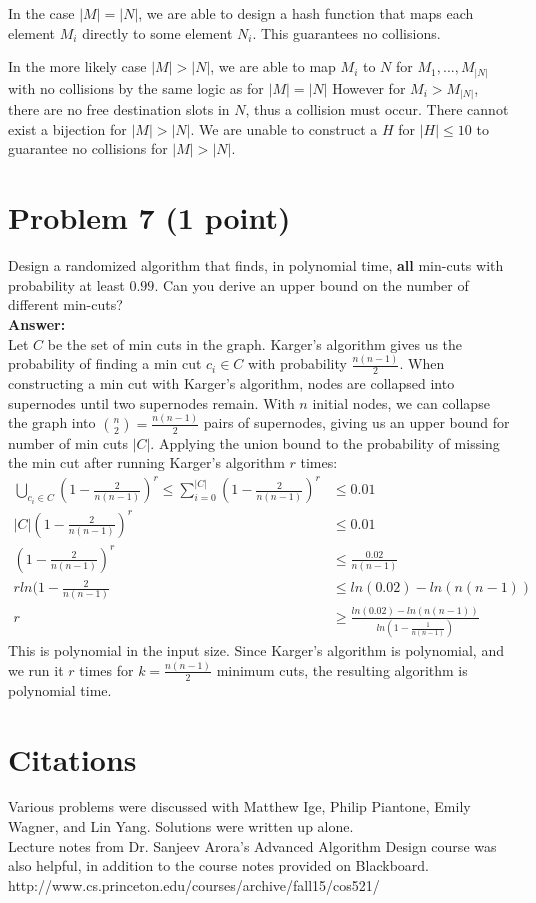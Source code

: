 \documentclass[letterpaper, 11pt]{article}
\begin{document}
In the case $|M|=|N|$, we are able to design a hash function that maps each element $M_i$ directly to some element $N_i$. This guarantees no collisions.

In the more likely case $|M| > |N|$, we are able to map $M_i$ to $N$ for $M_1, ...,M_{|N|}$ with no collisions by the same logic as for $|M| = |N|$ However for $M_i > M_{|N|}$, there are no free destination slots in $N$, thus a collision must occur. There cannot exist a bijection for $|M| > |N|$. We are unable to construct a $H$ for $|H| \leq 10$ to guarantee no collisions for $|M| > |N|$. 
\pagebreak
\section*{Problem 7 (1 point)}
Design a randomized algorithm that finds, in polynomial time, \textbf{all} min-cuts with probability at least $0.99$. Can you derive an upper bound on the number of different min-cuts? \\
\textbf{Answer:} \\
Let $C$ be the set of min cuts in the graph. Karger's algorithm gives us the probability of finding a min cut $c_i \in C$ with probability $\frac{n(n-1)}{2}$. When constructing a min cut with Karger's algorithm, nodes are collapsed into supernodes until two supernodes remain. With $n$ initial nodes, we can collapse the graph into $\binom{n}{2} = \frac{n(n-1)}{2}$ pairs of supernodes, giving us an upper bound for number of min cuts $|C|$. Applying the union bound to the probability of missing the min cut after running Karger's algorithm $r$ times:
\begin{align*}
\bigcup_{c_i \in C}\left(1-\frac{2}{n(n-1)}\right)^r \leq \sum_{i=0}^{|C|}\left(1-\frac{2}{n(n-1)}\right)^r &\leq 0.01 \\
|C|\left(1-\frac{2}{n(n-1)}\right)^r &\leq 0.01 \\
\left(1-\frac{2}{n(n-1)}\right)^r &\leq \frac{0.02}{n(n-1)} \\
r ln(1-\frac{2}{n(n-1)} &\leq ln(0.02)-ln(n(n-1)) \\
r &\geq \frac{ln(0.02)-ln(n(n-1))}{ln\left(1-\frac{1}{n(n-1)}\right)}
\end{align*}
This is polynomial in the input size. Since Karger's algorithm is polynomial, and we run it $r$ times for $k=\frac{n(n-1)}{2}$ minimum cuts, the resulting algorithm is polynomial time.

\pagebreak
\section*{Citations}
Various problems were discussed with Matthew Ige, Philip Piantone, Emily Wagner, and Lin Yang. Solutions were written up alone. \\
Lecture notes from Dr. Sanjeev Arora's Advanced Algorithm Design course was also helpful, in addition to the course notes provided on Blackboard.\\
http://www.cs.princeton.edu/courses/archive/fall15/cos521/
\end{document}

